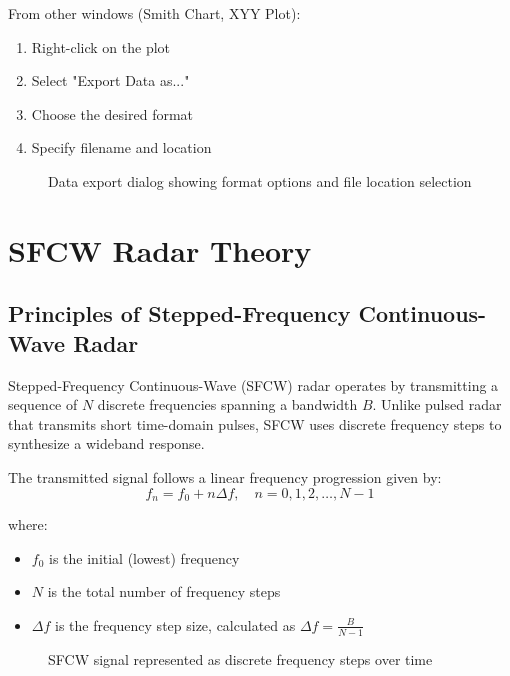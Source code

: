 \documentclass[12pt,a4paper]{article}
\begin{document}
From other windows (Smith Chart, XYY Plot):
\begin{enumerate}
    \item Right-click on the plot
    \item Select "Export Data as..."
    \item Choose the desired format
    \item Specify filename and location
\end{enumerate}

\begin{figure}[H]
    \centering
    \caption{Data export dialog showing format options and file location selection}
    \label{fig:export}
\end{figure}

\section{SFCW Radar Theory}

\subsection{Principles of Stepped-Frequency Continuous-Wave Radar}

Stepped-Frequency Continuous-Wave (SFCW) radar operates by transmitting a sequence of $N$ discrete frequencies spanning a bandwidth $B$. Unlike pulsed radar that transmits short time-domain pulses, SFCW uses discrete frequency steps to synthesize a wideband response.

The transmitted signal follows a linear frequency progression given by:
\begin{equation}
    f_n = f_0 + n \Delta f,\quad n = 0, 1, 2, \ldots, N-1
\end{equation}

where:
\begin{itemize}
    \item $f_0$ is the initial (lowest) frequency
    \item $N$ is the total number of frequency steps
    \item $\Delta f$ is the frequency step size, calculated as $\Delta f = \frac{B}{N-1}$
\end{itemize}

\begin{figure}[H]
    \centering
    \caption{SFCW signal represented as discrete frequency steps over time}
    \label{fig:sfcw_principle}
\end{figure}
\end{document}
